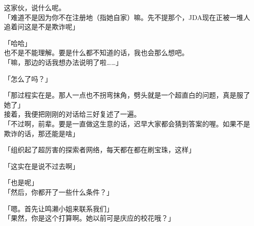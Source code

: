 这家伙，说什么呢。\\

「难道不是因为你不在注册地（指她自家）嘛。先不提那个，JDA现在正被一堆人追着问这是不是欺诈呢」

「哈哈」\\

也不是不能理解。要是什么都不知道的话，我也会那么想吧。\\

「嘛，那边的话我想办法说明了啦……」

「怎么了吗？」

「那过程实在是。那人一点也不拐弯抹角，劈头就是一个超直白的问题，真是服了她了」\\

接着，我便把刚刚的对话给三好复述了一遍。\\

「不过啊，前辈。要是一直做这生意的话，迟早大家都会猜到答案的喔。如果不是欺诈的话，那还能是啥」

「组织起了超厉害的探索者网络，每天都在都在刷宝珠，这样」

「这实在是说不过去啊」

「也是呢」\\

「然后，你都开了一些什么条件？」

「嗯。首先让鸣濑小姐来联系我们」\\

「果然，你是这个打算啊。她以前可是庆应的校花哦？」

